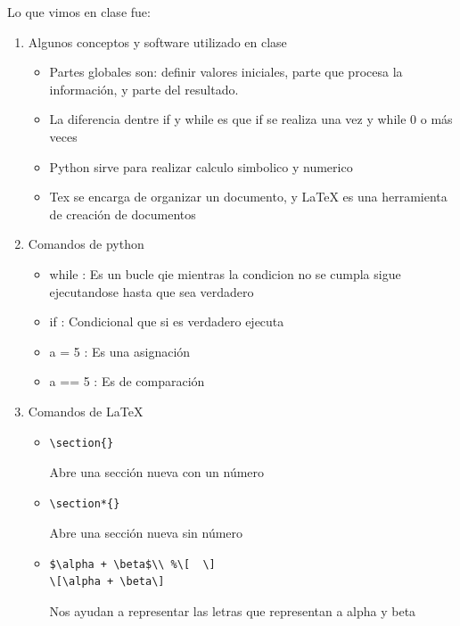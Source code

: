 \documentclass[letterpaper, 12pt, oneside]{article}%
\begin{document}
	Lo que vimos en clase fue:%
	\begin{enumerate}%
		\item Algunos conceptos y software utilizado en clase%
		\begin{itemize}
			\item Partes globales son: definir valores iniciales, parte que procesa la información, y parte del resultado.	
			\item La diferencia dentre if y while es que if se realiza una vez y while 0 o más veces		
			\item Python sirve para realizar calculo simbolico y numerico
			\item Tex se encarga de organizar un documento, y LaTeX es una herramienta de creación de documentos
		\end{itemize}
		
		\item Comandos de python%
		\begin{itemize}%
			\item while : Es un bucle qie mientras la condicion no se cumpla sigue ejecutandose hasta que sea verdadero
			\item if : Condicional que si es verdadero ejecuta
			\item a = 5 : Es una asignación
			\item a == 5 : Es de comparación
			
			
			
		\end{itemize}%
		\item Comandos de LaTeX
		\begin{itemize}
			\item  
			\begin{lstlisting}  
\section{} 
			\end{lstlisting} Abre una sección nueva con un número
			\item 
			\begin{lstlisting}  
\section*{}
			\end{lstlisting} Abre una sección nueva sin número
			\item 
			\begin{lstlisting}  
$\alpha + \beta$\\ %\[  \]
\[\alpha + \beta\] 
			\end{lstlisting} Nos ayudan a representar las letras que representan a alpha y beta\\
			

\end{itemize}
\end{enumerate}
\end{document}
